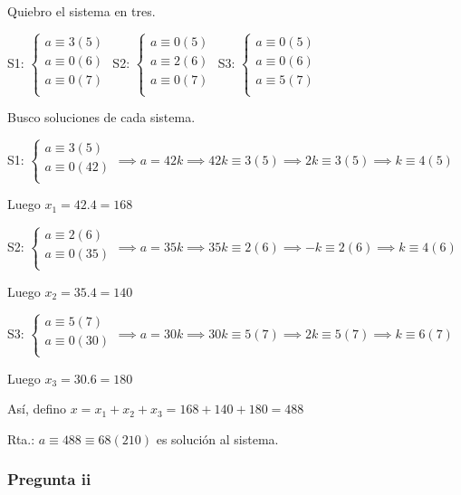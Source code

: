 Quiebro el sistema en tres.

S1: $ \begin{cases}
    a \equiv 3(5) \\
    a \equiv 0(6) \\
    a \equiv 0(7) \\
\end{cases} $
S2: $ \begin{cases}
    a \equiv 0(5) \\
    a \equiv 2(6) \\
    a \equiv 0(7) \\
\end{cases} $
S3: $ \begin{cases}
    a \equiv 0(5) \\
    a \equiv 0(6) \\
    a \equiv 5(7) \\
\end{cases} $

Busco soluciones de cada sistema.

S1: $ \begin{cases}
    a \equiv 3(5) \\
    a \equiv 0(42) \\
\end{cases} \implies a = 42k \implies 42k \equiv 3(5) \implies 2k \equiv 3(5) \implies k \equiv 4(5) $

Luego $ x_1 = 42.4 = 168 $

S2: $ \begin{cases}
    a \equiv 2(6) \\
    a \equiv 0(35) \\
\end{cases} \implies a = 35k \implies 35k \equiv 2(6) \implies -k \equiv 2(6) \implies k \equiv 4(6) $

Luego $ x_2 = 35.4 = 140 $

S3: $ \begin{cases}
    a \equiv 5(7) \\
    a \equiv 0(30) \\
\end{cases} \implies a = 30k \implies 30k \equiv 5(7) \implies 2k \equiv 5(7) \implies k \equiv 6(7) $

Luego $ x_3 = 30.6 = 180 $

Así, defino $ x = x_1 + x_2 + x_3 = 168 + 140 +180 = 488 $

Rta.: $ a\equiv 488 \equiv 68 (210) $ es solución al sistema.

\subsubsection{Pregunta ii}

